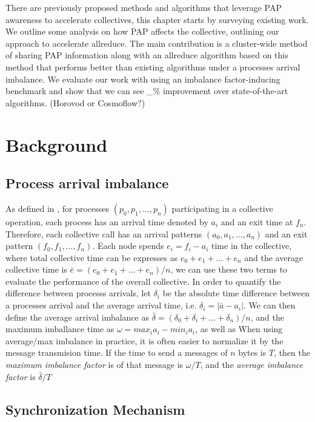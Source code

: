 There are previously proposed methods and algorithms that leverage PAP awareness to accelerate collectives, this chapter starts by surveying existing work.
We outline some analysis on how PAP affects the collective, outlining our approach to accelerate allreduce.
The main contribution is a cluster-wide method of sharing PAP information along with an allreduce algorithm based on this method that performs better than existing algorithms under a processes arrival imbalance.
We evaluate our work with using an imbalance factor-inducing benchmark and show that we can see \_\% improvement over state-of-the-art algorithms.  
(Horovod or Cosmoflow?)

\section{Background}

\subsection{Process arrival imbalance}
As defined in \cite{Faraj2008StudyProcArrivalMPIColl}, for processes $(p_0, p_1,...,p_n)$ participating in a collective operation, each process has an arrival time denoted by $a_i$ and an exit time at $f_n$.
Therefore, each collective call has an arrival patterns $(a_0, a_1, ..., a_n)$ and an exit pattern $(f_0, f_1, ..., f_n)$.
Each node spends $e_i = f_i - a_i$ time in the collective, where total collective time can be expresses as $e_0 + e_1 + ... + e_n$ and the average collective time is $\bar{e} = (e_0 + e_1 + ... + e_n)/n$, we can use these two terms to evaluate the performance of the overall collective.
In order to quantify the difference between processs arrivals, let $\delta_i$ be the absolute time difference between a processes arrival and the average arrival time, i.e. $\delta_i = |\bar{a} - a_i|$. 
We can then define the average arrival imbalance as $\bar{\delta}=(\delta_0 + \delta_i + ... + \delta_n)/n$, and the maximum imballance time as $\omega = max_i{a_i}-min_i{a_i}$, as well as 
When using average/max imbalance in practice, it is often easier to normalize it by the message transmision time.
If the time to send a messages of $n$ bytes is $T$, then the \textit{maximum imbalance factor} is of that message is $\omega/T$, and the \textit{average imbalance factor} is $\bar{\delta}/T$


\subsection{Synchronization Mechanism}

